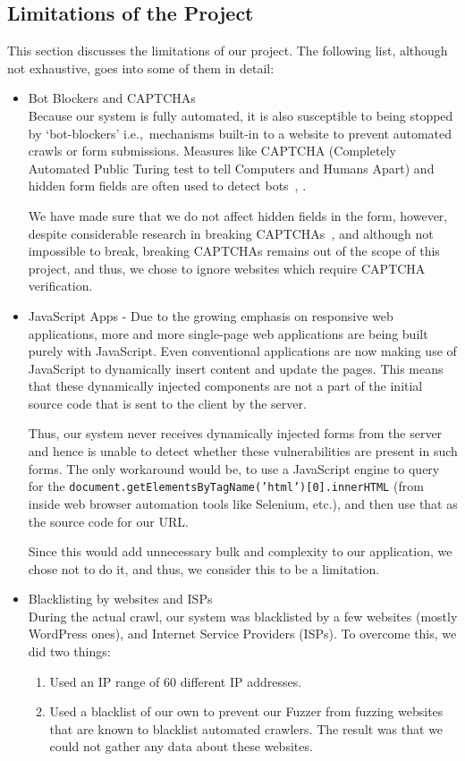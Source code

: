 \subsection[Limitations]{Limitations of the Project}
\label{limitations}
	This section discusses the limitations of our project. The following list, although not exhaustive, goes into some of them in detail:
	\begin{itemize}
		\item Bot Blockers and CAPTCHAs\\
		Because our system is fully automated, it is also susceptible to being stopped by `bot-blockers' i.e.,\ mechanisms built-in to a website to prevent automated crawls or form submissions. Measures like CAPTCHA (Completely Automated Public Turing test to tell Computers and Humans Apart) and hidden form fields are often used to detect bots~\cite{captchas3}, \cite{captchas2}.

		We have made sure that we do not affect hidden fields in the form, however, despite considerable research in breaking CAPTCHAs~\cite{captchas2}, \cite{captchas} and although not impossible to break, breaking CAPTCHAs remains out of the scope of this project, and thus, we chose to ignore websites which require CAPTCHA verification.

		\item JavaScript Apps - Due to the growing emphasis on responsive web applications, more and more single-page web applications are being built purely with JavaScript. Even conventional applications are now making use of JavaScript to dynamically insert content and update the pages. This means that these dynamically injected components are not a part of the initial source code that is sent to the client by the server.

		Thus, our system never receives dynamically injected forms from the server and hence is unable to detect whether these vulnerabilities are present in such forms. The only workaround would be, to use a JavaScript engine to query for the \texttt{document.getElementsByTagName('html')[0].innerHTML} (from inside web browser automation tools like Selenium, etc.), and then use that as the source code for our URL.

		Since this would add unnecessary bulk and complexity to our application, we chose not to do it, and thus, we consider this to be a limitation.

		\item Blacklisting by websites and ISPs\\
		During the actual crawl, our system was blacklisted by a few websites (mostly WordPress ones), and Internet Service Providers (ISPs).
		To overcome this, we did two things:
		\begin{enumerate}
			\item Used an IP range of 60 different IP addresses.
			\item Used a blacklist of our own to prevent our Fuzzer from fuzzing websites that are known to blacklist automated crawlers.  The result was that we could not gather any data about these websites.
		\end{enumerate}


\end{itemize}
